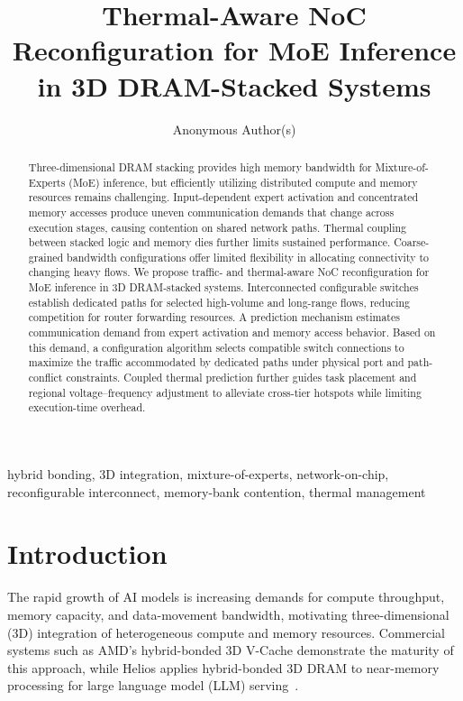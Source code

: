 \documentclass[conference,10pt]{IEEEtran}
\title{Thermal-Aware NoC Reconfiguration for MoE Inference in 3D DRAM-Stacked Systems}
\author{Anonymous Author(s)}
\begin{document}
\maketitle

\begin{abstract}
Three-dimensional DRAM stacking provides high memory bandwidth for Mixture-of-Experts (MoE) inference, but efficiently utilizing distributed compute and memory resources remains challenging. Input-dependent expert activation and concentrated memory accesses produce uneven communication demands that change across execution stages, causing contention on shared network paths. Thermal coupling between stacked logic and memory dies further limits sustained performance. Coarse-grained bandwidth configurations offer limited flexibility in allocating connectivity to changing heavy flows. We propose traffic- and thermal-aware NoC reconfiguration for MoE inference in 3D DRAM-stacked systems. Interconnected configurable switches establish dedicated paths for selected high-volume and long-range flows, reducing competition for router forwarding resources. A prediction mechanism estimates communication demand from expert activation and memory access behavior. Based on this demand, a configuration algorithm selects compatible switch connections to maximize the traffic accommodated by dedicated paths under physical port and path-conflict constraints. Coupled thermal prediction further guides task placement and regional voltage--frequency adjustment to alleviate cross-tier hotspots while limiting execution-time overhead.
\end{abstract}

\begin{IEEEkeywords}
hybrid bonding, 3D integration, mixture-of-experts, network-on-chip,
reconfigurable interconnect, memory-bank contention, thermal management
\end{IEEEkeywords}
\raggedbottom

\section{Introduction}
\label{sec:introduction}

The rapid growth of AI models is increasing demands for compute throughput,
memory capacity, and data-movement bandwidth, motivating three-dimensional (3D)
integration of heterogeneous compute and memory resources. Commercial systems
such as AMD's hybrid-bonded 3D V-Cache demonstrate the maturity of this approach,
while Helios applies hybrid-bonded 3D DRAM to near-memory processing for
large language model (LLM) serving~\cite{wuu2022vcache,li2026helios}.
\end{document}
